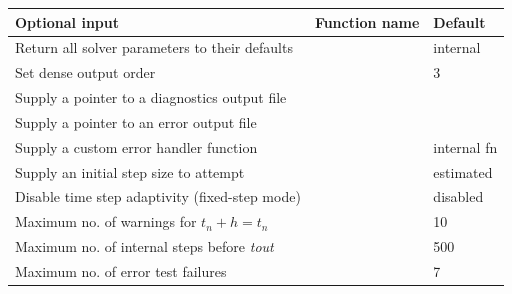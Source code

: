 \documentclass[letterpaper,10pt,english]{sphinxmanual}
\begin{document}
\begin{tabulary}{\linewidth}{|L|L|L|}
\hline
\textbf{
Optional input
} & \textbf{
Function name
} & \textbf{
Default
}\\\hline

Return all solver parameters to their defaults
 & 
{\hyperref[c_interface/User_callable:ARKodeSetDefaults]{}}
 & 
internal
\\\hline

Set dense output order
 & 
{\hyperref[c_interface/User_callable:ARKodeSetDenseOrder]{}}
 & 
3
\\\hline

Supply a pointer to a diagnostics output file
 & 
{\hyperref[c_interface/User_callable:ARKodeSetDiagnostics]{}}
 & 
\\\hline

Supply a pointer to an error output file
 & 
{\hyperref[c_interface/User_callable:ARKodeSetErrFile]{}}
 & 
\\\hline

Supply a custom error handler function
 & 
{\hyperref[c_interface/User_callable:ARKodeSetErrHandlerFn]{}}
 & 
internal fn
\\\hline

Supply an initial step size to attempt
 & 
{\hyperref[c_interface/User_callable:ARKodeSetInitStep]{}}
 & 
estimated
\\\hline

Disable time step adaptivity (fixed-step mode)
 & 
{\hyperref[c_interface/User_callable:ARKodeSetFixedStep]{}}
 & 
disabled
\\\hline

Maximum no. of warnings for $t_n+h = t_n$
 & 
{\hyperref[c_interface/User_callable:ARKodeSetMaxHnilWarns]{}}
 & 
10
\\\hline

Maximum no. of internal steps before \emph{tout}
 & 
{\hyperref[c_interface/User_callable:ARKodeSetMaxNumSteps]{}}
 & 
500
\\\hline

Maximum no. of error test failures
 & 
{\hyperref[c_interface/User_callable:ARKodeSetMaxErrTestFails]{}}
 & 
7
\\\hline


\end{tabulary}
\end{document}
